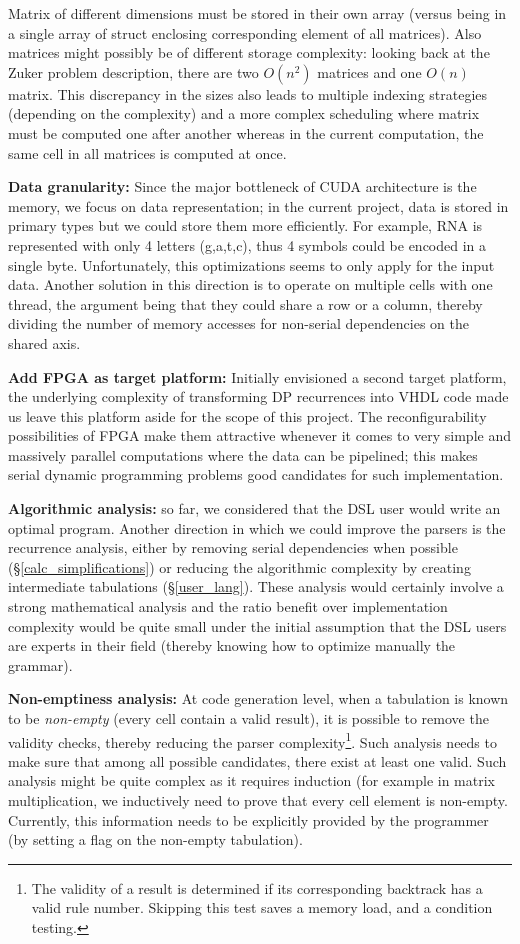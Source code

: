 Matrix of different dimensions must be stored in their own array (versus being in a single array of struct enclosing corresponding element of all matrices). Also matrices might possibly be of different storage complexity: looking back at the Zuker problem description, there are two $O(n^2)$ matrices and one $O(n)$ matrix. This discrepancy in the sizes also leads to multiple indexing strategies (depending on the complexity) and a more complex scheduling where matrix must be computed one after another whereas in the current computation, the same cell in all matrices is computed at once.
\item \textbf{Data granularity:} Since the major bottleneck of CUDA architecture is the memory, we focus on data representation; in the current project, data is stored in primary types but we could store them more efficiently. For example, RNA is represented with only 4 letters (g,a,t,c), thus 4 symbols could be encoded in a single byte. Unfortunately, this optimizations seems to only apply for the input data. Another solution in this direction is to operate on multiple cells with one thread, the argument being that they could share a row or a column, thereby dividing the number of memory accesses for non-serial dependencies on the shared axis.
\item \textbf{Add FPGA as target platform:} Initially envisioned a second target platform, the underlying complexity of transforming DP recurrences into VHDL code made us leave this platform aside for the scope of this project. The reconfigurability possibilities of FPGA make them attractive whenever it comes to very simple and massively parallel computations where the data can be pipelined; this makes serial dynamic programming problems good candidates for such implementation.
\item \textbf{Algorithmic analysis:} so far, we considered that the DSL user would write an optimal program. Another direction in which we could improve the parsers is the recurrence analysis, either by removing serial dependencies when possible (\S\ref{calc_simplifications}) or reducing the algorithmic complexity by creating intermediate tabulations (\S\ref{user_lang}). These analysis would certainly involve a strong mathematical analysis and the ratio benefit over implementation complexity would be quite small under the initial assumption that the DSL users are experts in their field (thereby knowing how to optimize manually the grammar).
\item \textbf{Non-emptiness analysis:} At code generation level, when a tabulation is known to be \textit{non-empty} (every cell contain a valid result), it is possible to remove the validity checks, thereby reducing the parser complexity\footnote{The validity of a result is determined if its corresponding backtrack has a valid rule number. Skipping this test saves a memory load, and a condition testing.}. Such analysis needs to make sure that among all possible candidates, there exist at least one valid. Such analysis might be quite complex as it requires induction (for example in matrix multiplication, we inductively need to prove that every cell element is non-empty. Currently, this information needs to be explicitly provided by the programmer (by setting a flag on the non-empty tabulation).
